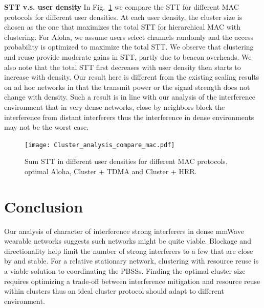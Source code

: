 \documentclass[10pt, conference, letterpaper]{IEEEtran}
\begin{document}
\textbf{STT v.s. user density} In Fig.~\ref{fig:clusteranalysis:compare_mac} we compare the STT for different MAC protocols for different user densities. 
At each user density, the cluster size is chosen as the one that maximizes the total STT for hierarchical MAC with clustering. 
For Aloha, we assume users select channels randomly and the access probability is optimized to maximize the total STT. 
We observe that clustering and reuse provide moderate gains in STT, partly due to beacon overheads. %
We also note that the total STT first decreases with user density then starts to increase with density.
Our result here is different from the existing scaling results on ad hoc networks in that the transmit power or the signal strength does not change with density.
Such a result is in line with our analysis of the interference environment that in very dense networks, close by neighbors block the interference from distant interferers thus the interference in dense environments may not be the worst case. 
 

\begin{figure}
	\centering
	\texttt{[image: Cluster\_analysis\_compare\_mac.pdf]}
	\caption{Sum STT in different user densities for different MAC protocols, optimal Aloha, Cluster + TDMA and Cluster + HRR.}
	\label{fig:clusteranalysis:compare_mac}
\end{figure}


\section{Conclusion}\label{section:conclusion}	
Our analysis of character of interference strong interferers in dense mmWave wearable networks suggests such networks might be quite viable. 
Blockage and directionality help limit the number of strong interferers to a few that are close by and stable.
For a relative stationary network, clustering with resource reuse is a viable solution to coordinating the PBSSs. 
Finding the optimal cluster size requires optimizing a trade-off between interference mitigation and resource reuse within clusters thus an ideal cluster protocol should adapt to different environment. 
\end{document}
